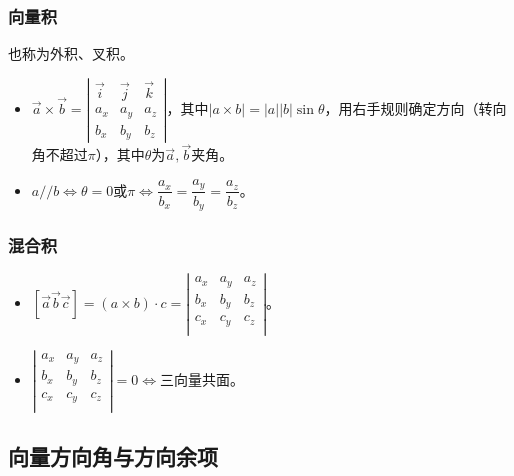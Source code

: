 \documentclass[UTF8, 12pt]{ctexart}
\begin{document}
\subsubsection{向量积}

也称为外积、叉积。

\begin{itemize}
    \item $\vec{a}\times\vec{b}=\left\vert\begin{array}{ccc}
        \vec{i} & \vec{j} & \vec{k} \\
        a_x & a_y & a_z \\
        b_x & b_y & b_z
    \end{array}\right\vert$，其中$\vert a\times b\vert=\vert a\vert\vert b\vert\sin\theta$，用右手规则确定方向（转向角不超过$\pi$），其中$\theta$为$\vec{a},\vec{b}$夹角。
    \item $a//b\Leftrightarrow\theta=0$或$\pi\Leftrightarrow\dfrac{a_x}{b_x}=\dfrac{a_y}{b_y}=\dfrac{a_z}{b_z}$。
\end{itemize}

\subsubsection{混合积}

\begin{itemize}
    \item $[\vec{a}\vec{b}\vec{c}]=(a\times b)\cdot c=\left\vert\begin{array}{ccc}
        a_x & a_y & a_z \\
        b_x & b_y & b_z \\
        c_x & c_y & c_z \\
    \end{array}\right\vert$。
    \item $\left\vert\begin{array}{ccc}
        a_x & a_y & a_z \\
        b_x & b_y & b_z \\
        c_x & c_y & c_z \\
    \end{array}\right\vert=0\Leftrightarrow$三向量共面。
\end{itemize}

\subsection{向量方向角与方向余项}
\end{document}
